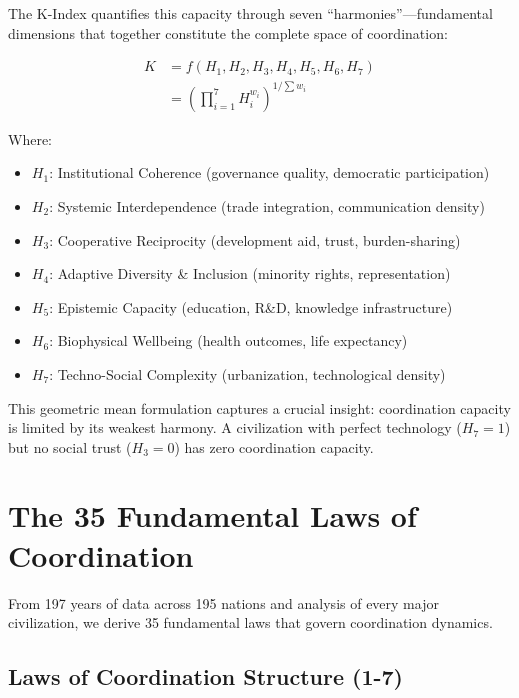 \documentclass[12pt,letterpaper]{article}
\begin{document}
The K-Index quantifies this capacity through seven ``harmonies''---fundamental dimensions that together constitute the complete space of coordination:

\begin{align}
K &= f(H_1, H_2, H_3, H_4, H_5, H_6, H_7) \\
&= \left(\prod_{i=1}^{7} H_i^{w_i}\right)^{1/\sum w_i}
\end{align}

Where:
\begin{itemize}
    \item $H_1$: Institutional Coherence (governance quality, democratic participation)
    \item $H_2$: Systemic Interdependence (trade integration, communication density)
    \item $H_3$: Cooperative Reciprocity (development aid, trust, burden-sharing)
    \item $H_4$: Adaptive Diversity \& Inclusion (minority rights, representation)
    \item $H_5$: Epistemic Capacity (education, R\&D, knowledge infrastructure)
    \item $H_6$: Biophysical Wellbeing (health outcomes, life expectancy)
    \item $H_7$: Techno-Social Complexity (urbanization, technological density)
\end{itemize}

This geometric mean formulation captures a crucial insight: coordination capacity is limited by its weakest harmony. A civilization with perfect technology ($H_7 = 1$) but no social trust ($H_3 = 0$) has zero coordination capacity.

\section{The 35 Fundamental Laws of Coordination}

From 197 years of data across 195 nations and analysis of every major civilization, we derive 35 fundamental laws that govern coordination dynamics.

\subsection{Laws of Coordination Structure (1-7)}
\end{document}
